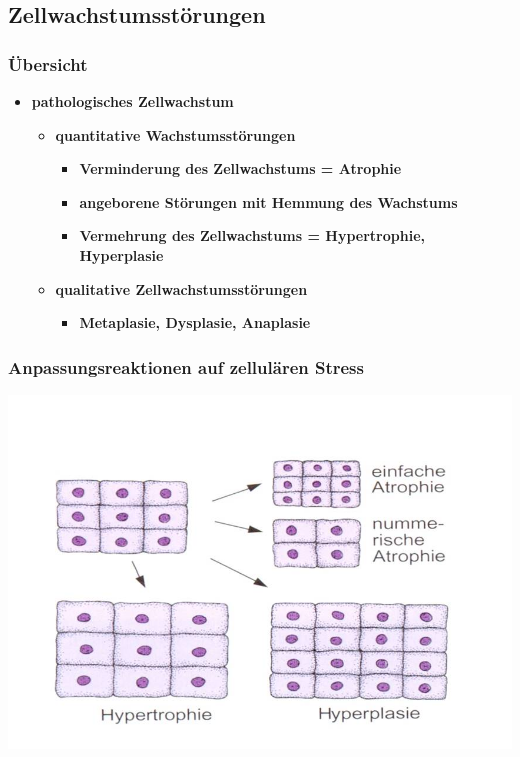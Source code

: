 \subsection{Zellwachstumsstörungen}
\subsubsection{Übersicht}
	\begin{itemize}
		\item \textbf{pathologisches Zellwachstum}
			\begin{itemize}
				\item \textbf{quantitative Wachstumsstörungen}
					\begin{itemize}
						\item \textbf{Verminderung des Zellwachstums = Atrophie}
						\item \textbf{angeborene Störungen mit Hemmung des Wachstums}
						\item \textbf{Vermehrung des Zellwachstums = Hypertrophie, Hyperplasie}
					\end{itemize}
				\item \textbf{qualitative Zellwachstumsstörungen}
					\begin{itemize}
						\item \textbf{Metaplasie, Dysplasie, Anaplasie}
					\end{itemize}
			\end{itemize}
	\end{itemize}

\subsubsection{Anpassungsreaktionen auf zellulären Stress}
	\begin{center}
		\includegraphics[scale=0.5]{Picture1.jpg}
	\end{center}

